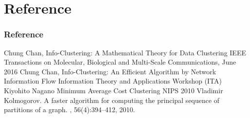 \documentclass[notheorems]{beamer}
\begin{document}
\section{Reference}
\begin{frame}
\frametitle{Reference}
\begin{thebibliography}{9}
 Chung Chan, \newblock Info-Clustering: A Mathematical Theory for Data Clustering
\newblock  IEEE Transactions on Molecular, Biological and Multi-Scale Communications, June 2016
  Chung Chan, \newblock Info-Clustering: An Efficient Algorithm by Network Information Flow
 Information Theory and Applications Workshop (ITA)
 Kiyohito Nagano \newblock Minimum Average Cost Clustering \newblock NIPS 2010
Vladimir Kolmogorov.
\newblock A faster algorithm for computing the principal sequence of partitions
of a graph.
, 56(4):394--412, 2010.
\end{thebibliography}
\end{frame}
\end{document}
